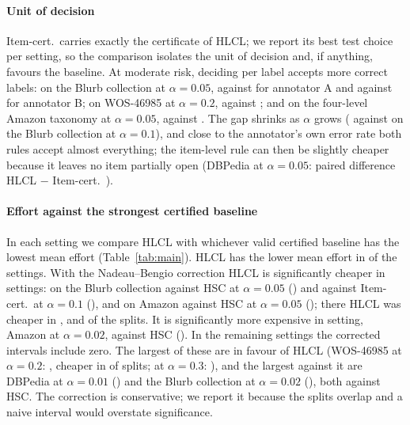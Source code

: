 \documentclass[preprint,12pt]{elsarticle}
\theoremstyle{definition}
\theoremstyle{remark}
\newcommand{\hlcl}{\textup{\textsc{HLCL}}}
\begin{document}
\paragraph{Unit of decision}
Item-cert.\ carries exactly the certificate of \hlcl{}; we report its best test
choice per setting, so the comparison isolates the unit of decision and, if
anything, favours the baseline. At moderate risk, deciding per label accepts
more correct labels: on the Blurb collection at $\alpha=0.05$,
 against  for
annotator A and  against
 for annotator B; on WOS-46985 at
$\alpha=0.2$,  against ;
and on the four-level Amazon taxonomy at $\alpha=0.05$,
 against .
The gap shrinks as $\alpha$ grows ( against
 on the Blurb collection at $\alpha=0.1$), and
close to the annotator's own error rate both rules accept almost everything;
the item-level rule can then be slightly cheaper because it leaves no item
partially open (DBPedia at $\alpha=0.05$: paired difference \hlcl{} $-$
Item-cert.\ ).

\paragraph{Effort against the strongest certified baseline}
In each setting we compare \hlcl{} with whichever valid certified baseline has
the lowest mean effort (Table~\ref{tab:main}). \hlcl{} has the lower mean effort
in  of the  settings. With the
Nadeau--Bengio correction \hlcl{} is significantly cheaper in 
settings: on the Blurb collection against HSC at $\alpha=0.05$
() and against Item-cert.\ at $\alpha=0.1$
(), and on Amazon against HSC at $\alpha=0.05$
(); there \hlcl{} was cheaper in
,  and
 of the splits. It is significantly more
expensive in  setting, Amazon at $\alpha=0.02$, against HSC
(). In the remaining  settings the
corrected intervals include zero. The largest of these are in favour of \hlcl{} (WOS-46985 at $\alpha=0.2$:
, cheaper in  of splits;
at $\alpha=0.3$: ), and the largest against it are
DBPedia at $\alpha=0.01$ () and the Blurb
collection at $\alpha=0.02$ (), both against HSC. The
correction is conservative; we report it because the splits overlap and a
naive interval would overstate significance.
\end{document}
